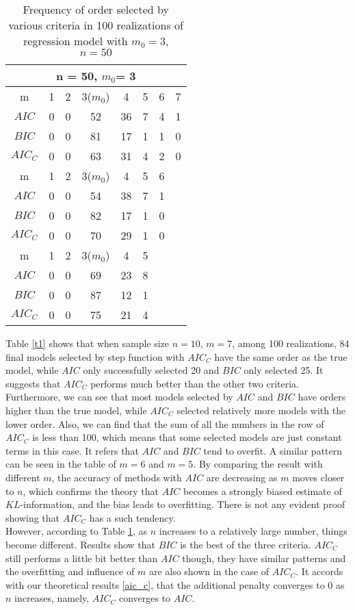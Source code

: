 \begin{table}[!h]
\begin{center}
\begin{tabular}{ c | c c c c c c c}
\hline
 \multicolumn{8}{c}{n = 50, $m_0$= 3} \\
 \hline
    m  & 1 & 2 & 3($m_0$) & 4 & 5 & 6 & 7\\
    \hline
 $AIC$ & 0 & 0 & 52 & 36 & 7 & 4 &1\\ 
 $BIC$ & 0 & 0 & 81 & 17 & 1 & 1 & 0 \\  
 $AIC_C$ & 0 & 0 & 63 & 31 & 4 & 2 & 0 \\
  \hline
    m  & 1 & 2 & 3($m_0$) & 4 & 5 & 6 & \\
    \hline
 $AIC$ & 0 & 0 & 54 & 38 & 7 & 1 &\\ 
 $BIC$ & 0 & 0 & 82 & 17 & 1 & 0 & \\ 
 $AIC_C$ & 0 & 0 & 70 & 29 & 1 & 0 &  \\
  \hline
    m  & 1 & 2 & 3($m_0$) & 4 & 5 &  & \\
    \hline
 $AIC$ & 0 & 0 & 69 & 23 & 8 &  &\\ 
 $BIC$ & 0 & 0 & 87 & 12 & 1 & & \\ 
 $AIC_C$ & 0 & 0 & 75 & 21 & 4 &  &  
\end{tabular}
\caption{\label{t2}Frequency of order selected by various criteria in 100 realizations of regression model with $m_0 = 3$, $n=50$}
\end{center}
\end{table}

Table \ref{t1} shows that when sample size $n=10$, $m =7$, among 100 realizations, 84 final models selected by step function with $AIC_C$ have the same order as the true model, while $AIC$ only successfully selected 20 and $BIC$ only selected 25. It suggests that $AIC_C$ performs much better than the other two criteria. Furthermore, we can see that most models selected by $AIC$ and $BIC$ have orders higher than the true model, while $AIC_C$ selected relatively more models with the lower order. Also, we can find that the sum of all the numbers in the row of $AIC_C$ is less than 100, which means that some selected models are just constant terms in this case. It refers that $AIC$ and $BIC$ tend to overfit. A similar pattern can be seen in the table of $m=6$ and $m=5$. By comparing the result with different $m$, the accuracy of methods with $AIC$ are decreasing as $m$ moves closer to $n$, which confirms the theory that $AIC$ becomes a strongly biased estimate of $KL$-information, and the bias leads to overfitting. There is not any evident proof showing that $AIC_C$ has a such tendency.\\

However, according to Table \ref{t2}, as $n$ increases to a relatively large number, things become different. Results show that $BIC$ is the best of the three criteria. $AIC_C$ still performs a little bit better than $AIC$ though, they have similar patterns and the overfitting and influence of $m$ are also shown in the case of $AIC_C$. It accords with our theoretical results \ref{aic_c}, that the additional penalty converges to 0 as $n$ increases, namely, $AIC_C$ converges to $AIC$.
